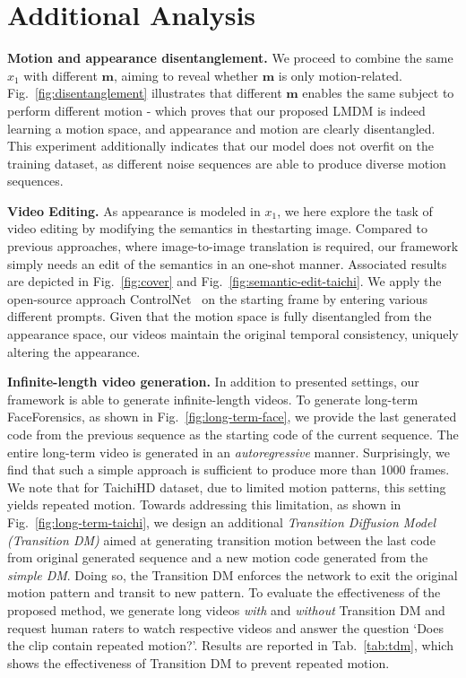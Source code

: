 {\section{Additional Analysis}

\textbf{Motion and appearance disentanglement.} We proceed to combine the same $x_1$ with different $\mathbf{m}$, aiming to reveal whether $\mathbf{m}$ is only motion-related. Fig.~\ref{fig:disentanglement} illustrates that different $\mathbf{m}$ enables the same subject to perform different motion - which proves that our proposed LMDM is indeed learning a motion space, and appearance and motion are clearly disentangled. This experiment additionally indicates that our model does not overfit on the training dataset, as different noise sequences are able to produce diverse motion sequences.

\textbf{Video Editing.} As appearance is modeled in $x_1$, we here explore the task of video editing by modifying the semantics in thestarting image. Compared to previous approaches, where image-to-image translation is required, our framework simply needs an edit of the semantics in an one-shot manner. Associated results are depicted in Fig.~\ref{fig:cover} and Fig.~\ref{fig:semantic-edit-taichi}. We apply the open-source approach ControlNet~\cite{controlnet} on the starting frame by entering various different prompts. Given that the motion space is fully disentangled from the appearance space, our videos maintain the original temporal consistency, uniquely altering the appearance. 

\textbf{Infinite-length video generation.}  
In addition to presented settings, our framework is able to generate infinite-length videos. To generate long-term FaceForensics, as shown in Fig.~\ref{fig:long-term-face}, we provide the last generated code from the previous sequence as the starting code of the current sequence. The entire long-term video is generated in an \textit{autoregressive} manner. Surprisingly, we find that such a simple approach is sufficient to produce more than 1000 frames. We note that for TaichiHD dataset, due to limited motion patterns, this setting yields repeated motion. Towards addressing this limitation, as shown in Fig.~\ref{fig:long-term-taichi}, we design an additional \textit{Transition Diffusion Model (Transition DM)} aimed at generating transition motion between the last code from original generated sequence and a new motion code generated from the \textit{simple DM}. Doing so, the Transition DM enforces the network to exit the original motion pattern and transit to new pattern. To evaluate the effectiveness of the proposed method, we generate long videos \textit{with} and \textit{without} Transition DM and request human raters to watch respective videos and answer the question `Does the clip contain repeated motion?'. Results are reported in Tab.~{\ref{tab:tdm}}, which shows the effectiveness of Transition DM to prevent repeated motion.

}
